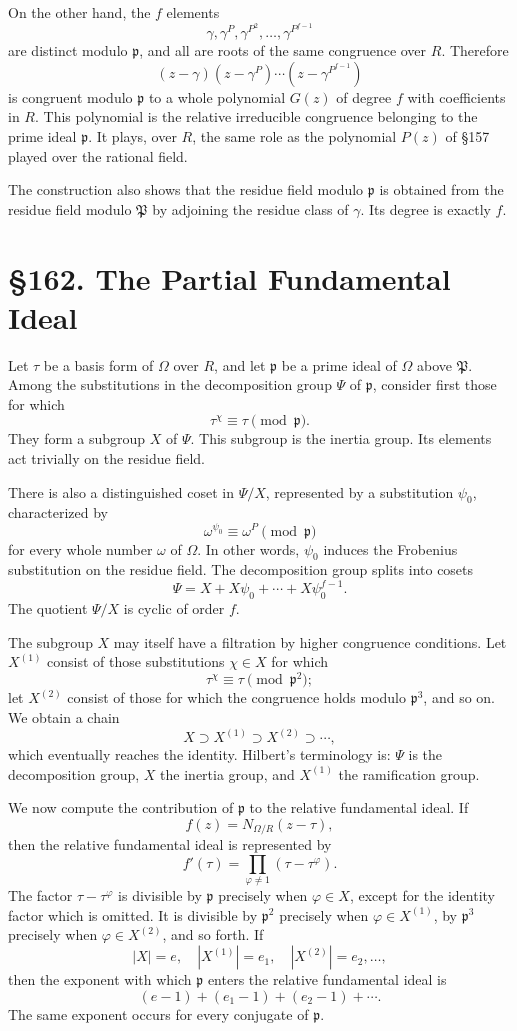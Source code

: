 \documentclass[12pt,a4paper]{article}
\newcommand{\webersection}[2]{\clearpage\section*{\S #1. #2}}
\newcommand{\Pgr}{\mathfrak P}
\newcommand{\p}{\mathfrak p}
\begin{document}
On the other hand, the \(f\) elements
\[
  \gamma,\gamma^P,\gamma^{P^2},\ldots,\gamma^{P^{f-1}}
\]
are distinct modulo \(\p\), and all are roots of the same congruence over \(R\).  Therefore
\[
  (z-\gamma)(z-\gamma^P)\cdots(z-\gamma^{P^{f-1}})
\tag{3}
\]
is congruent modulo \(\p\) to a whole polynomial \(G(z)\) of degree \(f\) with coefficients in \(R\).  This polynomial is the relative irreducible congruence belonging to the prime ideal \(\p\).  It plays, over \(R\), the same role as the polynomial \(P(z)\) of \S157 played over the rational field.

The construction also shows that the residue field modulo \(\p\) is obtained from the residue field modulo \(\Pgr\) by adjoining the residue class of \(\gamma\).  Its degree is exactly \(f\).

\webersection{162}{The Partial Fundamental Ideal}

Let \(\tau\) be a basis form of \(\Omega\) over \(R\), and let \(\p\) be a prime ideal of \(\Omega\) above \(\Pgr\).  Among the substitutions in the decomposition group \(\Psi\) of \(\p\), consider first those for which
\[
  \tau^\chi\equiv \tau\pmod{\p}.
\tag{1}
\]
They form a subgroup \(X\) of \(\Psi\).  This subgroup is the inertia group.  Its elements act trivially on the residue field.

There is also a distinguished coset in \(\Psi/X\), represented by a substitution \(\psi_0\), characterized by
\[
  \omega^{\psi_0}\equiv \omega^P\pmod{\p}
\tag{2}
\]
for every whole number \(\omega\) of \(\Omega\).  In other words, \(\psi_0\) induces the Frobenius substitution on the residue field.  The decomposition group splits into cosets
\[
  \Psi=X+X\psi_0+\cdots+X\psi_0^{f-1}.
\tag{3}
\]
The quotient \(\Psi/X\) is cyclic of order \(f\).

The subgroup \(X\) may itself have a filtration by higher congruence conditions.  Let \(X^{(1)}\) consist of those substitutions \(\chi\in X\) for which
\[
  \tau^\chi\equiv \tau\pmod{\p^2};
\]
let \(X^{(2)}\) consist of those for which the congruence holds modulo \(\p^3\), and so on.  We obtain a chain
\[
  X\supset X^{(1)}\supset X^{(2)}\supset\cdots,
\tag{4}
\]
which eventually reaches the identity.  Hilbert's terminology is: \(\Psi\) is the decomposition group, \(X\) the inertia group, and \(X^{(1)}\) the ramification group.

We now compute the contribution of \(\p\) to the relative fundamental ideal.  If
\[
  f(z)=N_{\Omega/R}(z-\tau),
\]
then the relative fundamental ideal is represented by
\[
  f'(\tau)=\prod_{\varphi\ne1}(\tau-\tau^\varphi).
\tag{5}
\]
The factor \(\tau-\tau^\varphi\) is divisible by \(\p\) precisely when \(\varphi\in X\), except for the identity factor which is omitted.  It is divisible by \(\p^2\) precisely when \(\varphi\in X^{(1)}\), by \(\p^3\) precisely when \(\varphi\in X^{(2)}\), and so forth.  If
\[
  |X|=e,\quad |X^{(1)}|=e_1,\quad |X^{(2)}|=e_2,\ldots,
\]
then the exponent with which \(\p\) enters the relative fundamental ideal is
\[
  (e-1)+(e_1-1)+(e_2-1)+\cdots.
\tag{6}
\]
The same exponent occurs for every conjugate of \(\p\).
\end{document}
